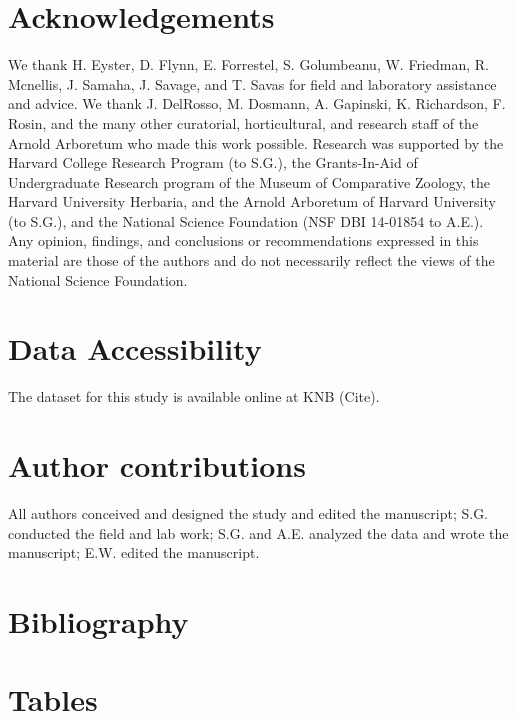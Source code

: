 \documentclass{article}
\begin{document}
\section*{Acknowledgements}
We thank H. Eyster, D. Flynn, E. Forrestel, S. Golumbeanu, W. Friedman, R. Mcnellis, J. Samaha, J. Savage, and T. Savas for field and laboratory assistance and advice. We thank J. DelRosso, M. Dosmann, A. Gapinski, K. Richardson, F. Rosin, and the many other curatorial, horticultural, and research staff of the Arnold Arboretum who made this work possible. Research was supported by the Harvard College Research Program (to S.G.), the Grants-In-Aid of Undergraduate Research program of the Museum of Comparative Zoology, the Harvard University Herbaria, and the Arnold Arboretum of Harvard University (to S.G.), and the National Science Foundation (NSF DBI 14-01854 to A.E.). Any opinion, findings, and conclusions or recommendations expressed in this material are those of the authors and do not necessarily reflect the views of the National Science Foundation.

\section*{Data Accessibility}
The dataset for this study is available online at KNB (Cite). 

\section*{Author contributions} All authors conceived and designed the study and edited the manuscript; S.G. conducted the field and lab work; S.G. and A.E. analyzed the data and wrote the manuscript; E.W. edited the manuscript.

\section{Bibliography}


\section* {Tables}
\end{document}
